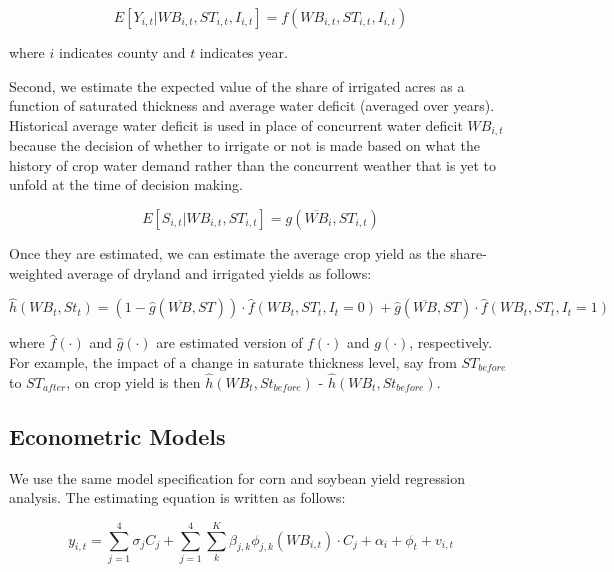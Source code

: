 \documentclass[
]{article}
\begin{document}
\[
E[Y_{i,t}|WB_{i,t}, ST_{i,t}, I_{i,t}]= f(WB_{i,t}, ST_{i,t}, I_{i,t})
\]

where \(i\) indicates county and \(t\) indicates year.

\noindent Second, we estimate the expected value of the share of irrigated acres as a function of saturated thickness and average water deficit (averaged over years). Historical average water deficit is used in place of concurrent water deficit \(WB_{i,t}\) because the decision of whether to irrigate or not is made based on what the history of crop water demand rather than the concurrent weather that is yet to unfold at the time of decision making.

\[
E[S_{i,t}|WB_{i,t}, ST_{i,t}]= g(\overline{WB}_i, ST_{i,t}) 
\]

\noindent Once they are estimated, we can estimate the average crop yield as the share-weighted average of dryland and irrigated yields as follows:

\[
\hat{h}(WB_t, St_t)= (1 - \hat{g}(\overline{WB}, ST) )\cdot \hat{f}(WB_t, ST_t, I_t = 0)+ \hat{g}(\overline{WB}, ST) \cdot \hat{f}(WB_t, ST_t, I_t = 1)
\]

\noindent where \(\hat{f}(\cdot)\) and \(\hat{g}(\cdot)\) are estimated version of \(f(\cdot)\) and \(g(\cdot)\), respectively. For example, the impact of a change in saturate thickness level, say from \(ST_{before}\) to \(ST_{after}\), on crop yield is then \(\hat{h}(WB_t, St_{before})\) - \(\hat{h}(WB_t, St_{before})\).

\hypertarget{econometric-models}{%
\subsection{Econometric Models}\label{econometric-models}}

We use the same model specification for corn and soybean yield regression analysis. The estimating equation is written as follows:

\[
y_{i,t} = \sum_{j=1}^4 \sigma_j C_j + \sum_{j=1}^4 \sum_{k}^K \beta_{j,k}\phi_{j,k}(WB_{i,t})\cdot C_j  + \alpha_i + \phi_t + v_{i,t}
\]
\end{document}
